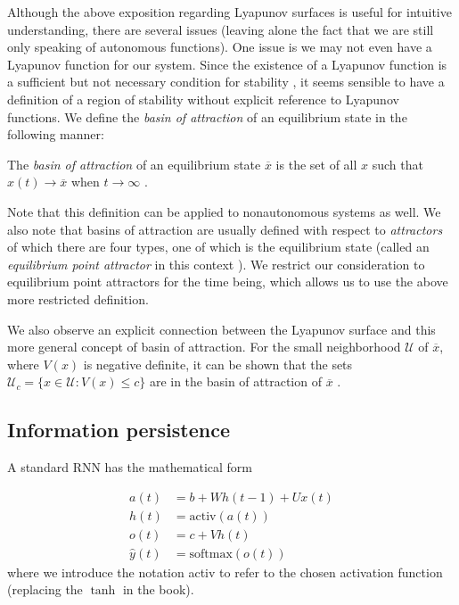 Although the above exposition regarding Lyapunov surfaces is useful for intuitive understanding, there are several issues (leaving alone the fact that we are still only speaking of autonomous functions). One issue is we may not even have a Lyapunov function for our system. Since the existence of a Lyapunov function is a sufficient but not necessary condition for stability \cite[p. 683]{Haykin:2009:NNC:1213811}, it seems sensible to have a definition of a region of stability without explicit reference to Lyapunov functions. We define the \emph{basin of attraction} of an equilibrium state in the following manner:

\begin{definition}
The \emph{basin of attraction} of an equilibrium state $\overline{x}$ is the set of all $x$ such that $x(t) \to \overline{x}$ when $t \to \infty$ \cite{ocostin}.
\end{definition}

Note that this definition can be applied to nonautonomous systems as well. We also note that basins of attraction are usually defined with respect to \emph{attractors} of which there are four types, one of which is the equilibrium state (called an \emph{equilibrium point attractor} in this context \cite[p. 179]{DBLP:journals/ai/Beer95}). We restrict our consideration to equilibrium point attractors for the time being, which allows us to use the above more restricted definition.

We also observe an explicit connection between the Lyapunov surface and this more general concept of basin of attraction. For the small neighborhood $\mathcal{U}$ of $\overline{x}$, where $V(x)$ is negative definite, it can be shown that the sets $\mathcal{U}_c = \{x \in \mathcal{U} : V(x) \leq c\}$ are in the basin of attraction of $\overline{x}$ \cite{anovozhilov}.

\subsection{Information persistence}

A standard RNN has the mathematical form \cite[p. 381]{Goodfellow-et-al-2016}

\begin{align*}
  a(t) & = b + W h(t-1) + U x(t) \\
  h(t) & = \mbox{activ}(a(t)) \\
  o(t) & = c + V h(t) \\
  \widehat{y}(t) & = \mbox{softmax}(o(t))
\end{align*}
%
where we introduce the notation \mbox{activ} to refer to the chosen activation function (replacing the $\tanh$ in the book).

